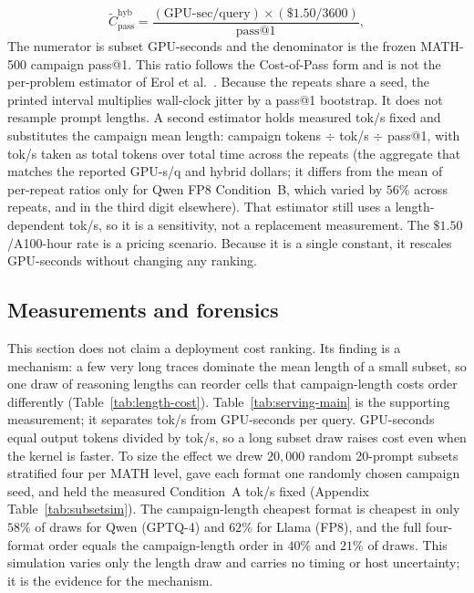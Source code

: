 \documentclass[11pt,a4paper]{article}
\begin{document}
\begin{equation}
\widetilde{C}_{\mathrm{pass}}^{\mathrm{hyb}} = \frac{(\text{GPU-sec/query})\times (\$1.50/3600)}{\mathrm{pass@1}},
\end{equation}
The numerator is subset GPU-seconds and the denominator is the frozen MATH-500 campaign pass@1. This ratio follows the Cost-of-Pass form and is not the per-problem estimator of Erol et al.~\cite{erol2025costofpass}. Because the repeats share a seed, the printed interval multiplies wall-clock jitter by a pass@1 bootstrap. It does not resample prompt lengths. A second estimator holds measured tok/s fixed and substitutes the campaign mean length: campaign tokens $\div$ tok/s $\div$ pass@1, with tok/s taken as total tokens over total time across the repeats (the aggregate that matches the reported GPU-s/q and hybrid dollars; it differs from the mean of per-repeat ratios only for Qwen FP8 Condition~B, which varied by $56\%$ across repeats, and in the third digit elsewhere). That estimator still uses a length-dependent tok/s, so it is a sensitivity, not a replacement measurement. The $\$1.50$/A100-hour rate is a pricing scenario. Because it is a single constant, it rescales GPU-seconds without changing any ranking.

\subsection{Measurements and forensics}
\label{sec:serving-results}
This section does not claim a deployment cost ranking. Its finding is a mechanism: a few very long traces dominate the mean length of a small subset, so one draw of reasoning lengths can reorder cells that campaign-length costs order differently (Table~\ref{tab:length-cost}). Table~\ref{tab:serving-main} is the supporting measurement; it separates tok/s from GPU-seconds per query. GPU-seconds equal output tokens divided by tok/s, so a long subset draw raises cost even when the kernel is faster. To size the effect we drew $20{,}000$ random 20-prompt subsets stratified four per MATH level, gave each format one randomly chosen campaign seed, and held the measured Condition~A tok/s fixed (Appendix Table~\ref{tab:subsetsim}). The campaign-length cheapest format is cheapest in only $58\%$ of draws for Qwen (GPTQ-4) and $62\%$ for Llama (FP8), and the full four-format order equals the campaign-length order in $40\%$ and $21\%$ of draws. This simulation varies only the length draw and carries no timing or host uncertainty; it is the evidence for the mechanism.
\end{document}
